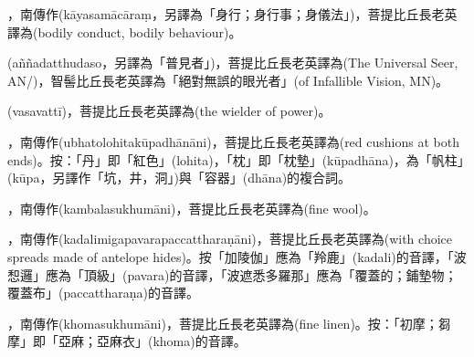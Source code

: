 \startitemgroup[noteitems]
\item{}，南傳作(kāyasamācāraṃ，另譯為「身行；身行事；身儀法」)，菩提比丘長老英譯為(bodily conduct, bodily behaviour)。
\stopitemgroup

\startitemgroup[noteitems]
\item{}(aññadatthudaso，另譯為「普見者」)，菩提比丘長老英譯為(The Universal Seer, AN/)，智髻比丘長老英譯為「絕對無誤的眼光者」(of Infallible Vision, MN)。
\stopitemgroup

\startitemgroup[noteitems]
\item{}(vasavattī)，菩提比丘長老英譯為(the wielder of power)。
\stopitemgroup

\startitemgroup[noteitems]
\item{}，南傳作(ubhatolohitakūpadhānāni)，菩提比丘長老英譯為(red cushions at both ends)。按：「丹」即「紅色」(lohita)，「枕」即「枕墊」(kūpadhāna)，為「帆柱」(kūpa，另譯作「坑，井，洞」)與「容器」(dhāna)的複合詞。
\stopitemgroup

\startitemgroup[noteitems]
\item{}，南傳作(kambalasukhumāni)，菩提比丘長老英譯為(fine wool)。
\stopitemgroup

\startitemgroup[noteitems]
\item{}，南傳作(kadalimigapavarapaccattharaṇāni)，菩提比丘長老英譯為(with choice spreads made of antelope hides)。按「加陵伽」應為「羚鹿」(kadali)的音譯，「波惒邏」應為「頂級」(pavara)的音譯，「波遮悉多羅那」應為「覆蓋的；鋪墊物；覆蓋布」(paccattharaṇa)的音譯。
\stopitemgroup

\startitemgroup[noteitems]
\item{}，南傳作(khomasukhumāni)，菩提比丘長老英譯為(fine linen)。按：「初摩；芻摩」即「亞麻；亞麻衣」(khoma)的音譯。
\stopitemgroup

